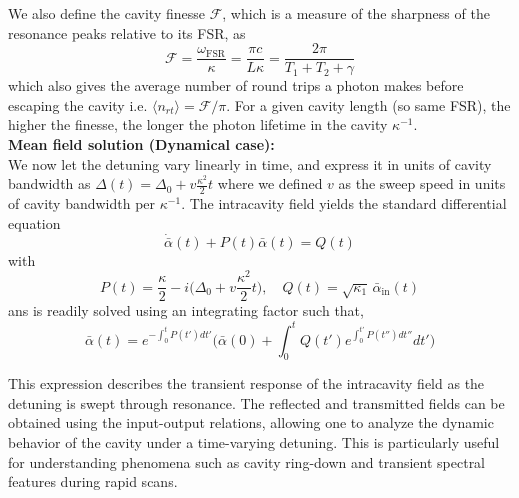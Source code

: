 We also define the cavity finesse $\mathcal{F}$, which is a measure of the sharpness of the resonance peaks relative to its FSR, as
\begin{equation}
  \mathcal{F} = \frac{\omega_{\mathrm{FSR}}}{\kappa} = \frac{\pi c}{L \kappa} = \frac{2\pi}{T_1 + T_2 + \gamma}
\end{equation}
which also gives the average number of round trips a photon makes before escaping the cavity i.e. $\langle n_{rt} \rangle = \mathcal{F}/\pi$. For a given cavity length (so same FSR), the higher the finesse, the longer the photon lifetime in the cavity $\kappa^{-1}$. \\


\noindent \textbf{Mean field solution (Dynamical case): } \\
We now let the detuning vary linearly in time, and express it in units of cavity bandwidth as $\Delta(t)= \Delta_0 + v \frac{\kappa^2}{2}t$ where we defined $v$ as the sweep speed in units of cavity bandwidth per $\kappa^{-1}$. The intracavity field yields the standard differential equation
\begin{equation}
  \dot{\bar{\alpha}}(t)  + P(t)\bar{\alpha}(t) = Q(t)
\end{equation} 
with 
\begin{equation*}
  P(t) = \frac{\kappa}{2} - i\Big(\Delta_0 + v \frac{\kappa^2}{2}t\Big), \quad Q(t) = \sqrt{\kappa_1} \, \bar{\alpha}_{\mathrm{in}}(t)
\end{equation*}
ans is readily solved using an integrating factor such that,
\begin{equation}
  \bar{\alpha}(t) = e^{-\int_0^t P(t') dt'} \Bigg( \bar{\alpha}(0) + \int_0^t Q(t') e^{\int_0^{t'} P(t'') dt''} dt' \Bigg)
\end{equation}


This expression describes the transient response of the intracavity field as the detuning is swept through resonance. The reflected and transmitted fields can be obtained using the input-output relations, allowing one to analyze the dynamic behavior of the cavity under a time-varying detuning. This is particularly useful for understanding phenomena such as cavity ring-down and transient spectral features during rapid scans. \\


